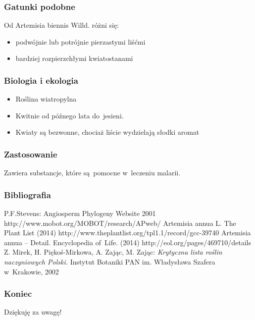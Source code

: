 \documentclass{beamer}
\begin{document}
\begin{frame}
	\frametitle{Gatunki podobne}
	Od Artemisia biennis Willd. różni się:
	\begin{itemize}
	\item podwójnie lub potrójnie pierzastymi liśćmi 
	\pause
	\item bardziej rozpierzchłymi kwiatostanami
	\end{itemize}
\end{frame}

\begin{frame}
	\frametitle{Biologia i ekologia}
	\begin{itemize}
		\item Roślina wiatropylna
		\pause
		\item Kwitnie od późnego lata do~jesieni.
		\pause
		\item Kwiaty są bezwonne, chociaż liście wydzielają słodki aromat
	\end{itemize}
\end{frame}

\begin{frame}
	\frametitle{Zastosowanie}
Zawiera substancje, które są~pomocne w~leczeniu malarii.
\end{frame}

\begin{frame}
	\frametitle{Bibliografia}
	\begin{thebibliography}{9}
		P.F.Stevens: Angiosperm Phylogeny Website 2001 http://www.mobot.org/MOBOT/research/APweb/
		Artemisia annua L. The Plant List (2014) http://www.theplantlist.org/tpl1.1/record/gcc-39740
		Artemisia annua – Detail. Encyclopedia of~Life. (2014) http://eol.org/pages/469710/details
		Z. Mirek, H. Piękoś-Mirkowa, A. Zając, M. Zając: \textit{Krytyczna lista roślin naczyniowych Polski.} Instytut Botaniki PAN im. Władysława Szafera w~Krakowie, 2002
		
	\end{thebibliography}
\end{frame}


\begin{frame}
	\frametitle{Koniec}
	\begin{center}
	Dziękuję za uwagę!
	\end{center}
\end{frame}	
	
\end{document}
